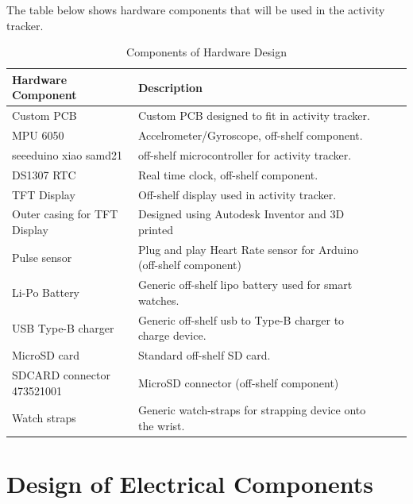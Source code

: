 \documentclass[12pt, titlepage]{article}
\begin{document}
The table below shows hardware components that will be used in the activity tracker.
\begin{table}[H]
	\begin{tabularx}{1.05\textwidth} { 
		  | >{\centering\arraybackslash}X 
		  | >{\centering\arraybackslash}X 
		  | >{\centering\arraybackslash}X 
		  | >{\centering\arraybackslash}X | }
		 \hline
		 \textbf{Hardware Component} & \textbf{Description}\\
		 \hline
		Custom PCB & Custom PCB designed to fit in activity tracker.  \\
		\hline 
		 MPU 6050 & Accelrometer/Gyroscope, off-shelf component.\\
		\hline
		 seeeduino xiao samd21  & off-shelf microcontroller for activity tracker.\\
		 \hline
		   DS1307 RTC & Real time clock, off-shelf component. \\
		\hline
		TFT Display & Off-shelf display used in activity tracker. \\
		\hline 
		Outer casing for TFT Display & Designed using Autodesk Inventor and 3D printed \\
		\hline 
		Pulse sensor & Plug and play Heart Rate sensor for Arduino (off-shelf component)\\
		\hline 
		Li-Po Battery & Generic off-shelf lipo battery used for smart watches.  \\
		\hline 
		USB Type-B charger & Generic off-shelf usb to Type-B charger to charge device. \\
		\hline 
		MicroSD card & Standard off-shelf SD card. \\
		\hline
		SDCARD connector 473521001& MicroSD connector (off-shelf component) \\
		\hline
		Watch straps & Generic watch-straps for strapping device onto the wrist. \\
		\hline 
	\end{tabularx}
\caption{\label{DesignHardware}Components of Hardware Design}  
\end{table}



\section{Design of Electrical Components}
\end{document}
